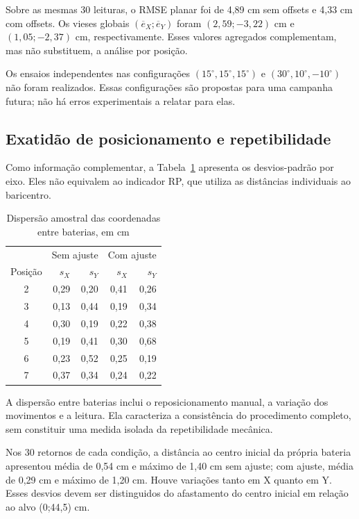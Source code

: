 Sobre as mesmas 30 leituras, o RMSE planar foi de 4,89 cm sem offsets e 4,33 cm com offsets. Os vieses globais $(\overline e_X;\overline e_Y)$ foram $(2,59;-3,22)$ cm e $(1,05;-2,37)$ cm, respectivamente. Esses valores agregados complementam, mas não substituem, a análise por posição.

Os ensaios independentes nas configurações $(15^\circ,15^\circ,15^\circ)$ e $(30^\circ,10^\circ,-10^\circ)$ não foram realizados. Essas configurações são propostas para uma campanha futura; não há erros experimentais a relatar para elas.

\subsection{Exatidão de posicionamento e repetibilidade}



Como informação complementar, a Tabela~\ref{tab:dispersao-medida} apresenta os desvios-padrão por eixo. Eles não equivalem ao indicador RP, que utiliza as distâncias individuais ao baricentro.

\begin{table}[H]\centering\caption{Dispersão amostral das coordenadas entre baterias, em cm}\label{tab:dispersao-medida}\small\begin{tabular}{crrrr}\toprule & \multicolumn{2}{c}{Sem ajuste} & \multicolumn{2}{c}{Com ajuste}\\ Posição & $s_X$ & $s_Y$ & $s_X$ & $s_Y$\\\midrule

2 & 0,29 & 0,20 & 0,41 & 0,26\\

3 & 0,13 & 0,44 & 0,19 & 0,34\\

4 & 0,30 & 0,19 & 0,22 & 0,38\\

5 & 0,19 & 0,41 & 0,30 & 0,68\\

6 & 0,23 & 0,52 & 0,25 & 0,19\\

7 & 0,37 & 0,34 & 0,24 & 0,22\\

\bottomrule\end{tabular}\par{}\end{table}

A dispersão entre baterias inclui o reposicionamento manual, a variação dos movimentos e a leitura. Ela caracteriza a consistência do procedimento completo, sem constituir uma medida isolada da repetibilidade mecânica.

Nos 30 retornos de cada condição, a distância ao centro inicial da própria bateria apresentou média de 0,54 cm e máximo de 1,40 cm sem ajuste; com ajuste, média de 0,29 cm e máximo de 1,20 cm. Houve variações tanto em X quanto em Y. Esses desvios devem ser distinguidos do afastamento do centro inicial em relação ao alvo (0;44,5) cm.
